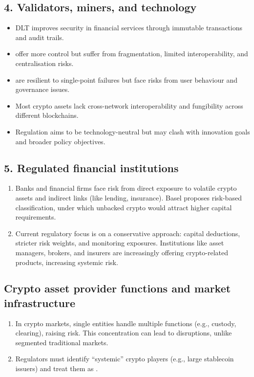 \subsection*{4. Validators, miners, and technology}

\begin{itemize}
\item DLT improves security in financial services through immutable transactions and audit
trails.
\item {} offer more control but suffer from fragmentation, limited
interoperability, and centralisation risks.
\item {} are resilient to single-point failures but face risks from
user behaviour and governance issues.
\item Most crypto assets lack cross-network interoperability and fungibility across different
blockchains.
\item Regulation aims to be technology-neutral but may clash with innovation goals and broader
policy objectives.
\end{itemize}

\subsection*{5. Regulated financial institutions}

\begin{enumerate}[label=\textbf{\alph*)}]
\item Banks and financial firms face risk from direct exposure to volatile crypto assets and
indirect links (like lending, insurance). Basel proposes risk-based classification, under
which unbacked crypto would attract higher capital requirements.
\item Current regulatory focus is on a conservative approach: capital deductions, stricter
risk weights, and monitoring exposures. Institutions like asset managers, brokers, and
insurers are increasingly offering crypto-related products, increasing systemic risk.
\end{enumerate}

\subsection*{Crypto asset provider functions and market infrastructure}

\begin{enumerate}[label=\textbf{\alph*)}]
\item In crypto markets, single entities handle multiple functions (e.g., custody, clearing),
raising risk. This concentration can lead to disruptions, unlike segmented traditional
markets.
\item Regulators must identify ``systemic'' crypto players (e.g., large stablecoin issuers)
and treat them as .
\end{enumerate}

